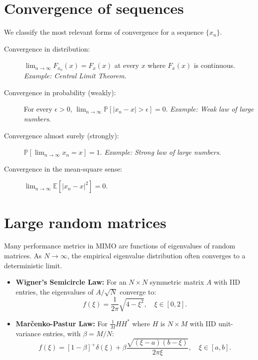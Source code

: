 \documentclass[a4paper, 12pt]{book}
\begin{document}
\section{Convergence of sequences}
We classify the most relevant forms of convergence for a sequence $\{x_n\}$.

\begin{description}
    \item[Convergence in distribution:] $\lim_{n\to\infty} F_{x_n}(x) = F_{x}(x)$ at every $x$ where $F_x(x)$ is continuous. \textit{Example: Central Limit Theorem}.
    
    \item[Convergence in probability (weakly):] For every $\epsilon>0$, $\lim_{n\rightarrow\infty}\mathbb{P}[|x_{n}-x|>\epsilon]=0$. \textit{Example: Weak law of large numbers}.
    
    \item[Convergence almost surely (strongly):] $\mathbb{P}[\lim_{n\rightarrow\infty}x_{n}=x]=1$. \textit{Example: Strong law of large numbers}.
    
    \item[Convergence in the mean-square sense:] $\lim_{n\rightarrow\infty}\mathbb{E}[|x_{n}-x|^2] = 0$.
\end{description}

\section{Large random matrices}
Many performance metrics in MIMO are functions of eigenvalues of random matrices. As $N \to \infty$, the empirical eigenvalue distribution often converges to a deterministic limit.

\begin{itemize}
    \item \textbf{Wigner's Semicircle Law:} For an $N \times N$ symmetric matrix $A$ with IID entries, the eigenvalues of $A/\sqrt{N}$ converge to:
    \begin{equation}
        f(\xi) = \frac{1}{2\pi}\sqrt{4-\xi^2}, \quad \xi \in [0, 2]. \tag{C.52}
    \end{equation}
    
    \item \textbf{Marčenko-Pastur Law:} For $\frac{1}{M}HH^{*}$ where $H$ is $N \times M$ with IID unit-variance entries, with $\beta = M/N$:
    \begin{equation}
        f(\xi) = [1-\beta]^{+}\delta(\xi) + \beta\frac{\sqrt{(\xi-a)(b-\xi)}}{2\pi\xi}, \quad \xi \in [a,b]. \tag{C.53}
    \end{equation}
\end{itemize}
\end{document}

